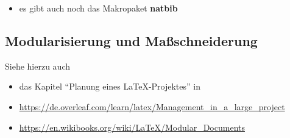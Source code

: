 \begin{itemize}
\begin{itemize}
\begin{itemize}
			\item kann UTF-8
			\item man ist dadurch flexibel hinsichtlich ``style guides'' (Stilvorgaben des Verlags, Zeitschrift, Betreuer,...)
		\end{itemize}
		\item siehe auch die Dokumentation von overleaf:\\
		\url{https://www.overleaf.com/learn/latex/bibliography_management_with_biblatex}
	\end{itemize}
	In der Präambel\\
	\hspace*{0.5cm}\\
	\hspace*{0.5cm}\\
	Im Dokumentkörper:\\
	\hspace*{0.5cm}\\
	\hspace*{0.5cm}
	\item es gibt auch noch das Makropaket \textbf{natbib}
\end{itemize}





\subsection{Modularisierung und Maßschneiderung}
Siehe hierzu auch
\begin{itemize}
	\item das Kapitel ``Planung eines \LaTeX-Projektes'' in \cite[Kapitel 11]{latex1}
	\item \url{https://de.overleaf.com/learn/latex/Management_in_a_large_project}
	\item \url{https://en.wikibooks.org/wiki/LaTeX/Modular_Documents}
\end{itemize}


